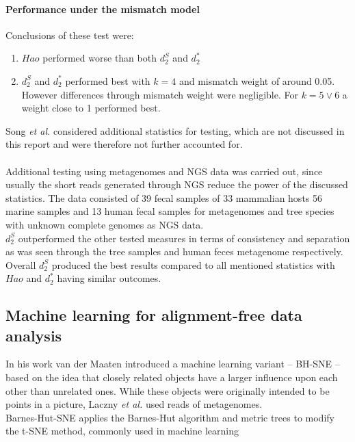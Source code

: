 \documentclass[twocolumn]{bmcart}%
\begin{document}
\paragraph*{Performance under the mismatch model}
Conclusions of these test were: 
\begin{enumerate}
\item $Hao$ performed worse than both $d_2^S$ and $d_2^*$	
\item $d_2^S$ and $d_2^*$ performed best with $k=4$ and mismatch weight of around 0.05. However differences through mismatch weight were negligible. For $k=5 \lor 6$ a weight close to 1 performed best.
\end{enumerate}
Song \textit{et al.} considered additional statistics for testing, which are not discussed in this report and were therefore not further accounted for.\\
\\
Additional testing using metagenomes and NGS data was carried out\cite{doi:10.1093/bib/bbt067}, since usually the short reads generated through NGS reduce the power of the discussed statistics. The data consisted of 39 fecal samples of 33 mammalian hosts\cite{muegge2011diet} 56 marine samples\cite{rusch2007sorcerer} and 13 human fecal samples\cite{kurokawa2007comparative} for metagenomes and tree species with unknown complete genomes as NGS data.\\
$d_2^S$ outperformed the other tested measures in terms of consistency and separation as was seen through the tree samples and human feces metagenome respectively. \\
Overall $d_2^S$ produced the best results compared to all mentioned statistics with $Hao$ and $d_2^*$ having similar outcomes.
\subsection*{Machine learning for alignment-free data analysis}
In his work van der Maaten \cite{DBLP:journals/corr/abs-1301-3342} introduced a machine learning variant -- BH-SNE --  based on the idea that closely related objects have a larger influence upon each other than unrelated ones. While these objects were originally intended to be points in a picture, Laczny \textit{et al.}\cite{Laczny2014} used reads of metagenomes.\\
Barnes-Hut-SNE applies the Barnes-Hut algorithm and metric trees to modify the t-SNE method, commonly used in machine learning
\end{document}
